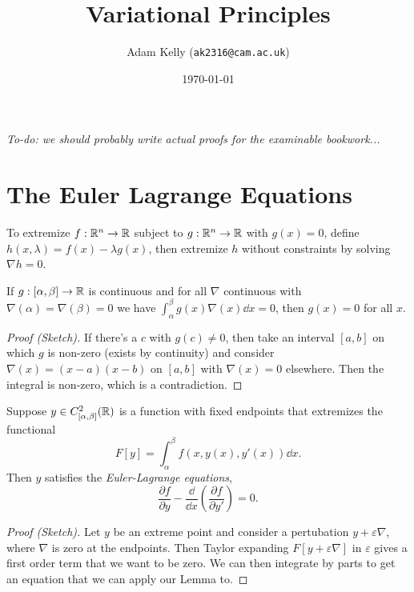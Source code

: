 \documentclass[a4paper]{amsart}
\title{Variational Principles}
\author{Adam Kelly (\texttt{ak2316@cam.ac.uk})}
\date{\today}
\begin{document}
\maketitle

\emph{To-do: we should probably write actual proofs for the examinable bookwork...}

\section{The Euler Lagrange Equations}

\begin{method}
	To extremize $f: \mathbb{R}^n \rightarrow \mathbb{R}$ subject to $g: \mathbb{R}^n \rightarrow \mathbb{R}$ with $g(x) = 0$, define $h(x, \lambda) = f(x) - \lambda g(x)$, then extremize $h$ without constraints by solving $\nabla h = 0$.
\end{method}

\begin{lemma}
		If $g: [\alpha, \beta] \rightarrow \mathbb{R}$ is continuous and for all $\nabla$ continuous with $\nabla(\alpha) = \nabla(\beta) = 0$ we have $\int_{\alpha}^{\beta}g(x)\nabla(x) \dd x = 0$, then $g(x) = 0$ for all $x$.
\end{lemma}
\begin{proof}[Proof (Sketch)]
If there's a $c$ with $g(c) \neq 0$, then take an interval $[a, b]$ on which $g$ is non-zero (exists by continuity) and consider $\nabla(x) = (x - a)(x - b)$ on $[a, b]$ with $\nabla(x) = 0$ elsewhere. Then the integral is non-zero, which is a contradiction.
\end{proof}

\begin{theorem}
	Suppose $y \in C^2_{[\alpha, \beta]}(\mathbb{R})$ is a function with fixed endpoints that extremizes the functional
	$$
	F[y] = \int_{\alpha}^{\beta} f(x, y(x), y'(x)) \dd x.
	$$
	Then $y$ satisfies the \emph{Euler-Lagrange equations},
	$$
	\frac{\partial f}{\partial y} - \frac{\dd}{\dd x} \left(\frac{\partial f}{\partial y'}\right) = 0.
	$$
\end{theorem}
\begin{proof}[Proof (Sketch)]
Let $y$ be an extreme point and consider a pertubation $y + \varepsilon \nabla$, where $\nabla$ is zero at the endpoints. Then Taylor expanding $F[y + \varepsilon \nabla]$ in $\varepsilon$ gives a first order term that we want to be zero. We can then integrate by parts to get an equation that we can apply our Lemma to.
\end{proof}
\end{document}
